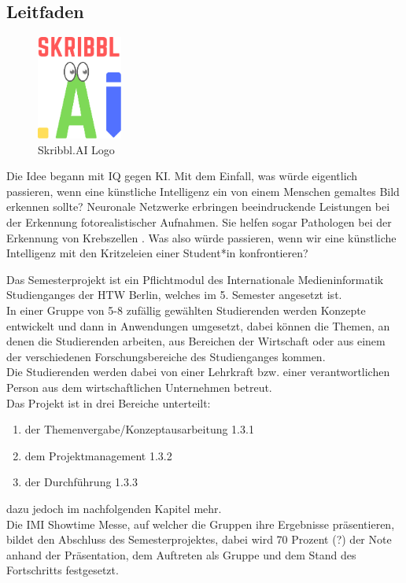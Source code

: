 \documentclass[11pt]{article}
\begin{document}
\subsection{Leitfaden}
\begin{figure}
\centering
\includegraphics[width=0.25\textwidth]{images/logo_skribbl.png}
\caption{\label{fig:skribblLogo}Skribbl.AI Logo}
\end{figure}
Die Idee begann mit IQ gegen KI. Mit dem Einfall, was würde eigentlich passieren, wenn eine künstliche Intelligenz ein von einem Menschen gemaltes Bild  erkennen sollte? Neuronale Netzwerke erbringen beeindruckende Leistungen bei der Erkennung fotorealistischer Aufnahmen. Sie helfen sogar Pathologen bei der Erkennung von Krebszellen \parencite{ElizabethDougherty2018}. Was also würde  passieren, wenn wir eine künstliche Intelligenz mit den Kritzeleien einer Student*in konfrontieren?

 
Das Semesterprojekt ist ein Pflichtmodul des Internationale Medieninformatik Studienganges der HTW Berlin, welches im 5. Semester angesetzt ist. \\
In einer Gruppe von 5-8 zufällig gewählten Studierenden werden Konzepte entwickelt und dann in Anwendungen umgesetzt, dabei können die Themen, an denen die Studierenden arbeiten, aus Bereichen der Wirtschaft oder aus einem der verschiedenen Forschungsbereiche des Studienganges kommen. \\
Die Studierenden werden dabei von einer Lehrkraft bzw. einer verantwortlichen Person aus dem wirtschaftlichen Unternehmen betreut.\\
Das Projekt ist in drei Bereiche unterteilt: 
\begin{enumerate}
	\item der Themenvergabe/Konzeptausarbeitung 1.3.1
	\item dem Projektmanagement 1.3.2
	\item der Durchführung 1.3.3
\end{enumerate}
dazu jedoch im nachfolgenden Kapitel mehr.\\
Die IMI Showtime Messe, auf welcher die Gruppen ihre Ergebnisse präsentieren, bildet den Abschluss des Semesterprojektes, dabei wird 70 Prozent (?) der Note anhand der Präsentation, dem Auftreten als Gruppe und dem Stand des Fortschritts festgesetzt.
\end{document}
